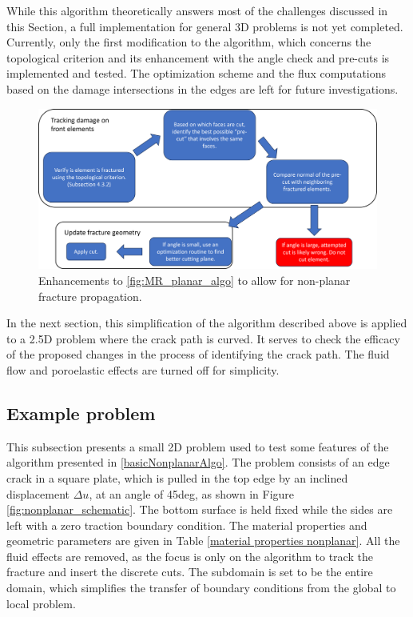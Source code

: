 While this algorithm theoretically answers most of the challenges discussed in this Section, a full implementation for general 3D problems is not yet completed. Currently, only the first modification to the algorithm, which concerns the topological criterion and its enhancement with the angle check and pre-cuts is implemented and tested. The optimization scheme and the flux computations based on the damage intersections in the edges are left for future investigations. 

\begin{figure}[h]
    \centering
    \includegraphics[width=\linewidth]{Chapter4/figures/nonplanar/nonplanar_algo.png}
    \caption{Enhancements to \ref{fig:MR_planar_algo} to allow for non-planar fracture propagation.}
    \label{fig:nonplanar_algo}
\end{figure}


In the next section, this simplification of the algorithm described above is applied to a 2.5D problem where the crack path is curved. It serves to check the efficacy of the proposed changes in the process of identifying the crack path. The fluid flow and poroelastic effects are turned off for simplicity.

\subsection{Example problem}

This subsection presents a small 2D problem used to test some features of the algorithm presented in \ref{basicNonplanarAlgo}. The problem consists of an edge crack in a square plate, which is pulled in the top edge by an inclined displacement $\Delta u$, at an angle of 45deg, as shown in Figure \ref{fig:nonplanar_schematic}. The bottom surface is held fixed while the sides are left with a zero traction boundary condition. The material properties and geometric parameters are given in Table \ref{material properties nonplanar}. All the fluid effects are removed, as the focus is only on the algorithm to track the fracture and insert the discrete cuts. The subdomain is set to be the entire domain, which simplifies the transfer of boundary conditions from the global to local problem. 

